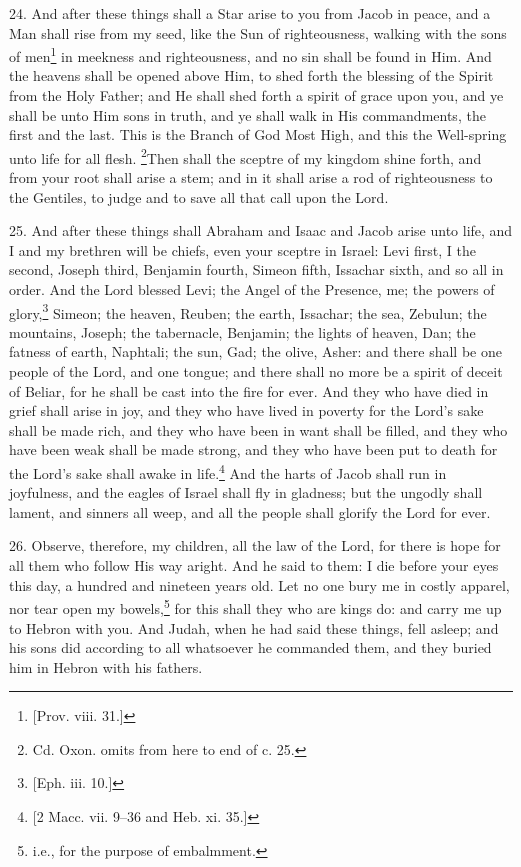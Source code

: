 24. And after these things shall a Star arise to you from Jacob in peace, and a Man shall rise from my seed, like the Sun of righteousness, walking with the sons of men\footnote{[Prov. viii. 31.]} in meekness and righteousness, and no sin shall be found in Him. And the heavens shall be opened above Him, to shed forth the blessing of the Spirit from the Holy Father; and He shall shed forth a spirit of grace upon you, and ye shall be unto Him sons in truth, and ye shall walk in His commandments, the first and the last. This is the Branch of God Most High, and this the Well-spring unto life for all flesh. \footnote{Cd. Oxon. omits from here to end of c. 25.}Then shall the sceptre of my kingdom shine forth, and from your root shall arise a stem; and in it shall arise a rod of righteousness to the Gentiles, to judge and to save all that call upon the Lord.

25. And after these things shall Abraham and Isaac and Jacob arise unto life, and I and my brethren will be chiefs, even your sceptre in Israel: Levi first, I the second, Joseph third, Benjamin fourth, Simeon fifth, Issachar sixth, and so all in order. And the Lord blessed Levi; the Angel of the Presence, me; the powers of glory,\footnote{[Eph. iii. 10.]} Simeon; the heaven, Reuben; the earth, Issachar; the sea, Zebulun; the mountains, Joseph; the tabernacle, Benjamin; the lights of heaven, Dan; the fatness of earth, Naphtali; the sun, Gad; the olive, Asher: and there shall be one people of the Lord, and one tongue; and there shall no more be a spirit of deceit of Beliar, for he shall be cast into the fire for ever. And they who have died in grief shall arise in joy, and they who have lived in poverty for the Lord’s sake shall be made rich, and they who have been in want shall be filled, and they who have been weak shall be made strong, and they who have been put to death for the Lord’s sake shall awake in life.\footnote{[2 Macc. vii. 9–36 and Heb. xi. 35.]} And the harts of Jacob shall run in joyfulness, and the eagles of Israel shall fly in gladness; but the ungodly shall lament, and sinners all weep, and all the people shall glorify the Lord for ever.

26. Observe, therefore, my children, all the law of the Lord, for there is hope for all them who follow His way aright. And he said to them: I die before your eyes this day, a hundred and nineteen years old. Let no one bury me in costly apparel, nor tear open my bowels,\footnote{i.e., for the purpose of embalmment.} for this shall they who are kings do: and carry me up to Hebron with you. And Judah, when he had said these things, fell asleep; and his sons did according to all whatsoever he commanded them, and they buried him in Hebron with his fathers.

